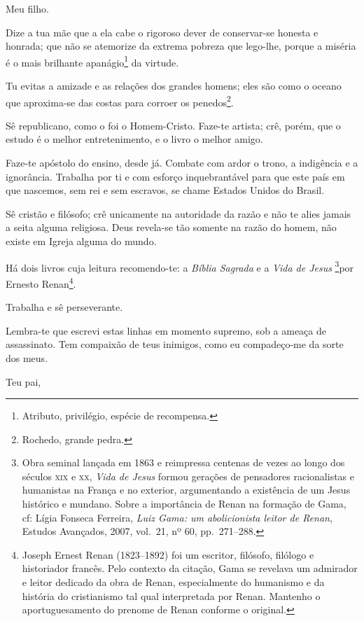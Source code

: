 {\asterisc{}

Meu filho.

Dize a tua mãe que a ela cabe o rigoroso dever de conservar-se honesta e
honrada; que não se atemorize da extrema pobreza que lego-lhe, porque a
miséria é o mais brilhante apanágio\footnote{ Atributo, privilégio,
  espécie de recompensa.} da virtude.

Tu evitas a amizade e as relações dos grandes homens; eles são como o
oceano que aproxima-se das costas para corroer os penedos\footnote{
  Rochedo, grande pedra.}.

Sê republicano, como o foi o Homem-Cristo. Faze-te artista; crê, porém,
que o estudo é o melhor entretenimento, e o livro o melhor amigo.

Faze-te apóstolo do ensino, desde já. Combate com ardor o trono, a
indigência e a ignorância. Trabalha por ti e com esforço inquebrantável
para que este país em que nascemos, sem rei e sem escravos, se chame
Estados Unidos do Brasil.

Sê cristão e filósofo; crê unicamente na autoridade da razão e não te
alies jamais a seita alguma religiosa. Deus revela-se tão somente na
razão do homem, não existe em Igreja alguma do mundo.

Há dois livros cuja leitura recomendo-te: a \emph{Bíblia Sagrada} e a
\emph{Vida de Jesus} \footnote{ Obra seminal lançada em 1863 e
  reimpressa centenas de vezes ao longo dos séculos \textsc{xix} e \textsc{xx}, \emph{Vida
  de Jesus} formou gerações de pensadores racionalistas e humanistas na
  França e no exterior, argumentando a existência de um Jesus histórico
  e mundano. Sobre a importância de Renan na formação de Gama, cf: Lígia
  Fonseca Ferreira, \emph{Luiz Gama: um abolicionista leitor de Renan},
  Estudos Avançados, 2007, vol.~21, nº 60, pp.~271--288.}por Ernesto
Renan\footnote{ Joseph Ernest Renan (1823--1892) foi um escritor,
  filósofo, filólogo e historiador francês. Pelo contexto da citação,
  Gama se revelava um admirador e leitor dedicado da obra de Renan,
  especialmente do humanismo e da história do cristianismo tal qual
  interpretada por Renan. Mantenho o aportuguesamento do prenome de
  Renan conforme o original.}.

Trabalha e sê perseverante.

Lembra-te que escrevi estas linhas em momento supremo, sob a ameaça de
assassinato. Tem compaixão de teus inimigos, como eu compadeço-me da
sorte dos meus.
\begin{flushright}
Teu pai,


\end{flushright}}
